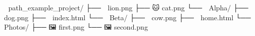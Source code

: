 📂 path_example_project/
├── 🦁 lion.png
├── 🐱 cat.png
└── 📂 Alpha/
    ├── 🐶 dog.png
    ├── 📄 index.html
    └── 📂 Beta/
        ├── 🐄 cow.png
        ├── 📄 home.html
        └── 📂 Photos/
            ├── 🖼️ first.png
            └── 🖼️ second.png
